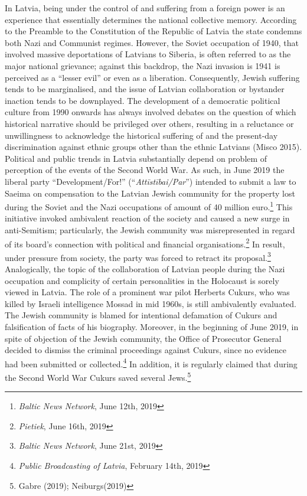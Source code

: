 In Latvia, being under the control of and suffering from a foreign power is an experience that essentially determines the national collective memory. According to the Preamble to the Constitution of the Republic of Latvia the state condemns both Nazi and Communist regimes. However, the Soviet occupation of 1940, that involved massive deportations of Latvians to Siberia, is often referred to as the major national grievance; against this backdrop, the Nazi invasion is 1941 is perceived as a “lesser evil” or even as a liberation. Consequently, Jewish suffering tends to be marginalised, and the issue of Latvian collaboration or bystander inaction tends to be downplayed. The development of a democratic political culture from 1990 onwards has always involved debates on the question of which historical narrative should be privileged over others, resulting in a reluctance or unwillingness to acknowledge the historical suffering of and the present-day discrimination against ethnic groups other than the ethnic Latvians (Misco 2015). \\
Political and public trends in Latvia substantially depend on problem of perception of the events of the Second World War. As such, in June 2019 the liberal party ``Development/For!'' (``\textit{Attīstībai/Par}'') intended to submit a law to Saeima on compensation to the Latvian Jewish community for the property lost during the Soviet and the Nazi occupations of amount of 40 million euro.\footnote{\textit{Baltic News Network}, June 12th, 2019} This initiative invoked ambivalent reaction of the society and caused a new surge in anti-Semitism; particularly, the Jewish community was misrepresented in regard of its board’s connection with political and financial organisations.\footnote{\textit{Pietiek}, June 16th, 2019} In result, under pressure from society, the party was forced to retract its proposal.\footnote{\textit{Baltic News Network}, June 21st, 2019}\\  
Analogically, the topic of the collaboration of Latvian people during the Nazi occupation and complicity of certain personalities in the Holocaust is sorely viewed in Latvia. The role of a prominent war pilot Herberts Cukurs, who was killed by Israeli intelligence Mossad in mid 1960s, is still ambivalently evaluated. The Jewish community is blamed for intentional defamation of Cukurs and falsification of facts of his biography. Moreover, in the beginning of June 2019, in spite of objection of the Jewish community, the Office of Prosecutor General decided to dismiss the criminal proceedings against Cukurs, since no evidence had been submitted or collected.\footnote{\textit{Public Broadcasting of Latvia}, February 14th, 2019} In addition, it is regularly claimed that during the Second World War Cukurs saved several Jews.\footnote{Gabre (2019); Neiburgs(2019)}\\
